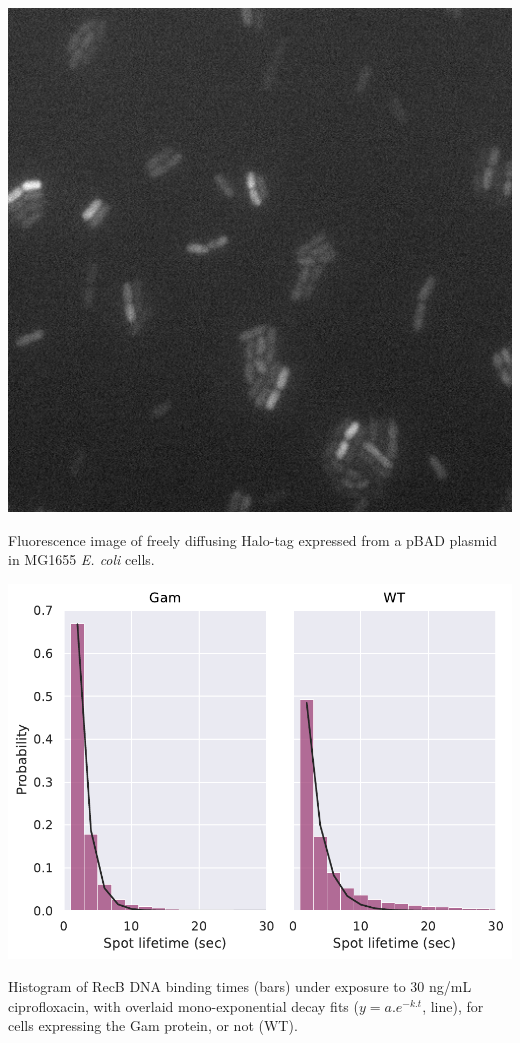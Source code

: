 
\begin{suppfigure*}[htbp]
\begin{center}
\includegraphics[width=.5\linewidth]{SI_Figures/Free_Halo_image.png}
\end{center}
\caption{Fluorescence image of freely diffusing Halo-tag expressed from a pBAD plasmid in MG1655 \textit{E. coli} cells.}
\label{SIFig:freehalo_image}
\end{suppfigure*}

\begin{suppfigure*}[htbp]
\begin{center}
\includegraphics[width=.5\linewidth]{SI_Figures/Monoexp_fits_Gam_cipro30.pdf}
\end{center}
\caption{Histogram of RecB DNA binding times (bars) under exposure to 30 ng/mL ciprofloxacin, with overlaid mono-exponential decay fits ($y=a.e^{-k.t}$, line), for cells expressing the Gam protein, or not (WT).}
\label{SIFig:monoexp_fits}
\end{suppfigure*}


